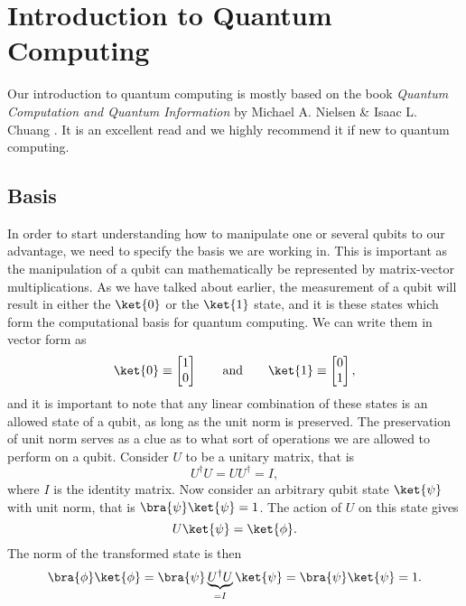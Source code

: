 \section{Introduction to Quantum Computing}
\label{sec:QCIntroduction}
Our introduction to quantum computing is mostly based on the book \textit{Quantum Computation and Quantum Information} by Michael A. Nielsen & Isaac L. Chuang \cite{NielsenAndChuang}. It is an excellent read and we highly recommend it if new to quantum computing.
\subsection{Basis}
\label{subsec:QCBasis}

In order to start understanding how to manipulate one or several qubits to our advantage, we need to specify the basis we are working in. This is important as the manipulation of a qubit can mathematically be represented by matrix-vector multiplications. As we have talked about earlier, the measurement of a qubit will result in either the $\ket{0}$ or the $\ket{1}$ state, and it is these states which form the computational basis for quantum computing. We can write them in vector form as
\begin{equation}
    \label{eq:QCChapComputationalBasisStates}
    \ket{0} \equiv \begin{bmatrix} 1 \\ 0
    \end{bmatrix}
    \qquad \text{and} \qquad 
    \ket{1} \equiv \begin{bmatrix} 0 \\ 1
    \end{bmatrix},
\end{equation}
and it is important to note that any linear combination of these states is an allowed state of a qubit, as long as the unit norm is preserved. The preservation of unit norm serves as a clue as to what sort of operations we are allowed to perform on a qubit. Consider $U$ to be a unitary matrix, that is
\begin{equation*}
    \label{eq:QCChapUnitaryMatrix}
    U^\dagger U = UU^\dagger = I,
\end{equation*}
where $I$ is the identity matrix. Now consider an arbitrary qubit state $\ket{\psi}$ with unit norm, that is $\bra{\psi} \ket{\psi} = 1$.
The action of $U$ on this state gives
$$U \ket{\psi} = \ket{\phi}.$$
The norm of the transformed state is then
\begin{equation*}
    \label{eq:QCCHapUnitaryPreserveNorm}
    \bra{\phi} \ket{\phi} = \bra{\psi} \underbrace{U^\dagger U}_{= I}\ket{\psi} = \bra{\psi} \ket{ \psi} = 1.
\end{equation*}
